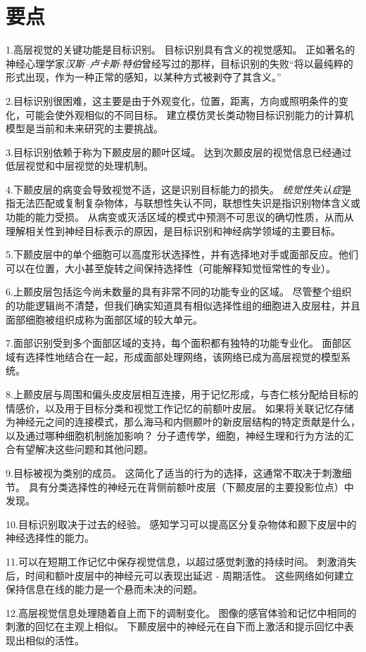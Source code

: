 \section{要点}

1.高层视觉的关键功能是目标识别。
目标识别具有含义的视觉感知。
正如著名的神经心理学家\textit{汉斯–卢卡斯$\cdot$特伯}曾经写过的那样，目标识别的失败“将以最纯粹的形式出现，作为一种正常的感知，以某种方式被剥夺了其含义。” 


2.目标识别很困难，这主要是由于外观变化，位置，距离，方向或照明条件的变化，可能会使外观相似的不同目标。
建立模仿灵长类动物目标识别能力的计算机模型是当前和未来研究的主要挑战。


3.目标识别依赖于称为下颞皮层的颞叶区域。
达到次颞皮层的视觉信息已经通过低层视觉和中层视觉的处理机制。


4.下颞皮层的病变会导致视觉不适，这是识别目标能力的损失。
\textit{统觉性失认症}是指无法匹配或复制复杂物体，与联想性失认不同，联想性失识是指识别物体含义或功能的能力受损。
从病变或灭活区域的模式中预测不可思议的确切性质，从而从理解相关性到神经目标表示的原因，是目标识别和神经病学领域的主要目标。 


5.下颞皮层中的单个细胞可以高度形状选择性，并有选择地对手或面部反应。他们可以在位置，大小甚至旋转之间保持选择性（可能解释知觉恒常性的专业）。


6.上颞皮层包括迄今尚未数量的具有非常不同的功能专业的区域。
尽管整个组织的功能逻辑尚不清楚，但我们确实知道具有相似选择性组的细胞进入皮层柱，并且面部细胞被组织成称为面部区域的较大单元。 


7.面部识别受到多个面部区域的支持，每个面积都有独特的功能专业化。
面部区域有选择性地结合在一起，形成面部处理网络，该网络已成为高层视觉的模型系统。


8.上颞皮层与周围和偏头皮皮层相互连接，用于记忆形成，与杏仁核分配给目标的情感价，以及用于目标分类和视觉工作记忆的前额叶皮层。
如果将关联记忆存储为神经元之间的连接模式，那么海马和内侧颞叶的新皮层结构的特定贡献是什么，以及通过哪种细胞机制施加影响？
分子遗传学，细胞，神经生理和行为方法的汇合有望解决这些问题和其他问题。


9.目标被视为类别的成员。
这简化了适当的行为的选择，这通常不取决于刺激细节。
具有分类选择性的神经元在背侧前额叶皮层（下颞皮层的主要投影位点）中发现。


10.目标识别取决于过去的经验。
感知学习可以提高区分复杂物体和颞下皮层中的神经选择性的能力。


11.可以在短期工作记忆中保存视觉信息，以超过感觉刺激的持续时间。
刺激消失后，时间和额叶皮层中的神经元可以表现出延迟 - 周期活性。
这些网络如何建立保持信息在线的能力是一个悬而未决的问题。


12.高层视觉信息处理随着自上而下的调制变化。
图像的感官体验和记忆中相同的刺激的回忆在主观上相似。
下颞皮层中的神经元在自下而上激活和提示回忆中表现出相似的活性。


